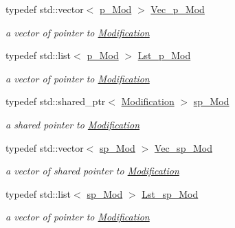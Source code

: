 \begin{DoxyCompactItemize}
typedef std\+::vector$<$ \mbox{\hyperlink{group___modification___t_y_p_e_s_ga0cc1ca46966ce3aebbe7f109241baf66}{p\+\_\+\+Mod}} $>$ \mbox{\hyperlink{group___modification___t_y_p_e_s_gaf929e6708a135742b2152b3f4ab011bc}{Vec\+\_\+p\+\_\+\+Mod}}
\begin{DoxyCompactList}\small\item\em a vector of pointer to \mbox{\hyperlink{class_s_m_spp__di__unipi__it_1_1_modification}{Modification}} \end{DoxyCompactList}\item 
typedef std\+::list$<$ \mbox{\hyperlink{group___modification___t_y_p_e_s_ga0cc1ca46966ce3aebbe7f109241baf66}{p\+\_\+\+Mod}} $>$ \mbox{\hyperlink{group___modification___t_y_p_e_s_ga84d50ff1c2c6487f884224ee0341160f}{Lst\+\_\+p\+\_\+\+Mod}}
\begin{DoxyCompactList}\small\item\em a vector of pointer to \mbox{\hyperlink{class_s_m_spp__di__unipi__it_1_1_modification}{Modification}} \end{DoxyCompactList}\item 
typedef std\+::shared\+\_\+ptr$<$ \mbox{\hyperlink{class_s_m_spp__di__unipi__it_1_1_modification}{Modification}} $>$ \mbox{\hyperlink{group___modification___t_y_p_e_s_ga9024cf2ead61a1280d29771b063b1a62}{sp\+\_\+\+Mod}}
\begin{DoxyCompactList}\small\item\em a shared pointer to \mbox{\hyperlink{class_s_m_spp__di__unipi__it_1_1_modification}{Modification}} \end{DoxyCompactList}\item 
typedef std\+::vector$<$ \mbox{\hyperlink{group___modification___t_y_p_e_s_ga9024cf2ead61a1280d29771b063b1a62}{sp\+\_\+\+Mod}} $>$ \mbox{\hyperlink{group___modification___t_y_p_e_s_ga877faafa15973eb552e53fec8208c54d}{Vec\+\_\+sp\+\_\+\+Mod}}
\begin{DoxyCompactList}\small\item\em a vector of shared pointer to \mbox{\hyperlink{class_s_m_spp__di__unipi__it_1_1_modification}{Modification}} \end{DoxyCompactList}\item 
typedef std\+::list$<$ \mbox{\hyperlink{group___modification___t_y_p_e_s_ga9024cf2ead61a1280d29771b063b1a62}{sp\+\_\+\+Mod}} $>$ \mbox{\hyperlink{group___modification___t_y_p_e_s_ga8a83b63d7963bc839660db495458f26d}{Lst\+\_\+sp\+\_\+\+Mod}}
\begin{DoxyCompactList}\small\item\em a vector of pointer to \mbox{\hyperlink{class_s_m_spp__di__unipi__it_1_1_modification}{Modification}} \end{DoxyCompactList}\item 

\end{DoxyCompactItemize}
